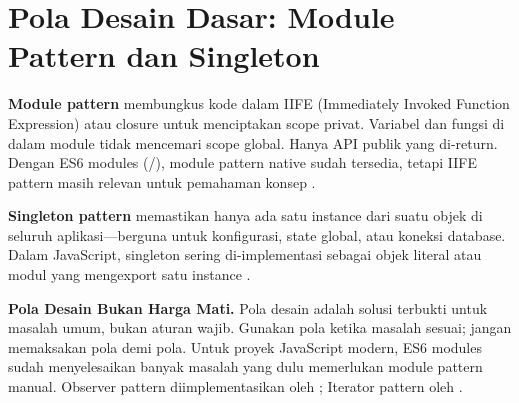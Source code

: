 \section{Pola Desain Dasar: Module Pattern dan Singleton}

\textbf{Module pattern} membungkus kode dalam IIFE (Immediately Invoked Function Expression) atau closure untuk menciptakan scope privat. Variabel dan fungsi di dalam module tidak mencemari scope global. Hanya API publik yang di-return. Dengan ES6 modules (/), module pattern native sudah tersedia, tetapi IIFE pattern masih relevan untuk pemahaman konsep \cite{eloquentJs}.

\textbf{Singleton pattern} memastikan hanya ada satu instance dari suatu objek di seluruh aplikasi---berguna untuk konfigurasi, state global, atau koneksi database. Dalam JavaScript, singleton sering di-implementasi sebagai objek literal atau modul yang mengexport satu instance \cite{jsInfo}.

\begin{catatan}
\textbf{Pola Desain Bukan Harga Mati.} Pola desain adalah solusi terbukti untuk masalah umum, bukan aturan wajib. Gunakan pola ketika masalah sesuai; jangan memaksakan pola demi pola. Untuk proyek JavaScript modern, ES6 modules sudah menyelesaikan banyak masalah yang dulu memerlukan module pattern manual. Observer pattern diimplementasikan oleh ; Iterator pattern oleh  \cite{mdnJsGuide}.
\end{catatan}

